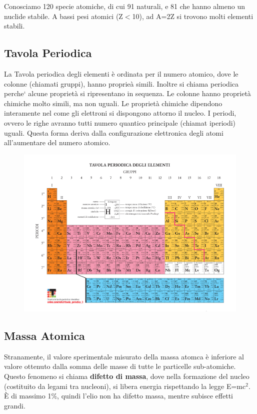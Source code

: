 \documentclass[a4paper]{article}
\begin{document}
Conosciamo 120 specie atomiche, di cui 91 naturali, e 81 che hanno almeno un nuclide stabile. A bassi pesi atomici (Z$<$10), ad A=2Z si trovono molti elementi stabili. 

\subsection{Tavola Periodica}
La Tavola periodica degli elementi è ordinata per il numero atomico, dove le colonne (chiamati gruppi), hanno proprieà simili. Inoltre si chiama periodica perche` alcune proprietà si ripresentano in sequenza. Le colonne hanno proprietà chimiche molto simili, ma non uguali. Le proprietà chimiche dipendono interamente nel come gli elettroni si dispongono attorno il nucleo. I periodi, ovvero le righe avranno tutti numero quantico principale (chiamat iperiodi) uguali. Questa forma deriva dalla configurazione elettronica degli atomi all'aumentare del numero atomico.  
\begin{figure}[!h]
    \includegraphics[width=\textwidth]{tavolaperiodica.jpg}
\end{figure}


\newpage
\subsection{Massa Atomica}
Stranamente, il valore sperimentale misurato della massa atomca è inferiore al valore ottenuto dalla somma delle masse di tutte le particelle sub-atomiche. Questo fenomeno si chiama \textbf{difetto di massa}, dove nella formazione del nucleo (costituito da legami tra nucleoni), si libera energia rispettando la legge E=mc$^2$. È di massimo 1\%, quindi l'elio  non ha difetto massa, mentre  subisce effetti grandi. 
\end{document}
